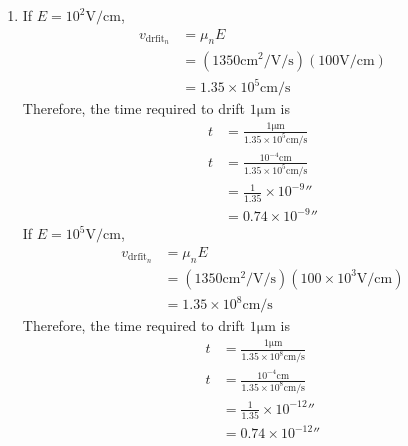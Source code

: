 \documentclass[fleqn, a4paper, 11pt, oneside]{amsart}
\theoremstyle{definition}
\theoremstyle{theorem}
\begin{document}
\begin{solution}
\begin{enumerate}[leftmargin=*]
\begin{figure}[H]
			\end{figure}
		\item
			If $E = 10^2 \si{\volt\per\centi\metre}$,
			\begin{align*}
				v_{\text{drfit}_n} & = \mu_n E                                                                                                         \\
                                                   & = \left( 1350 \si{\centi\metre\squared\per\volt\per\second} \right) \left( 100 \si{\volt\per\centi\metre} \right) \\
                                                   & = 1.35 \times 10^5 \si{\centi\metre\per\second}
			\end{align*}
			Therefore, the time required to drift $1 \si{\micro\metre}$ is
			\begin{align*}
				t & = \frac{1 \si{\micro\metre}}{1.35 \times 10^5 \si{\centi\metre\per\second}}       \\
				t & = \frac{10^{-4} \si{\centi\metre}}{1.35 \times 10^5 \si{\centi\metre\per\second}} \\
                                  & = \frac{1}{1.35} \times 10^{-9} \second                                           \\
                                  & = 0.74 \times10^{-9} \second
			\end{align*}
			If $E = 10^5 \si{\volt\per\centi\metre}$,
			\begin{align*}
				v_{\text{drfit}_n} & = \mu_n E                                                                                                                     \\
                                                   & = \left( 1350 \si{\centi\metre\squared\per\volt\per\second} \right) \left( 100 \times 10^3 \si{\volt\per\centi\metre} \right) \\
                                                   & = 1.35 \times 10^8 \si{\centi\metre\per\second}
			\end{align*}
			Therefore, the time required to drift $1 \si{\micro\metre}$ is
			\begin{align*}
				t & = \frac{1 \si{\micro\metre}}{1.35 \times 10^8 \si{\centi\metre\per\second}}       \\
				t & = \frac{10^{-4} \si{\centi\metre}}{1.35 \times 10^8 \si{\centi\metre\per\second}} \\
                                  & = \frac{1}{1.35} \times 10^{-12} \second                                          \\
                                  & = 0.74 \times10^{-12} \second
			\end{align*}
	\end{enumerate}
\end{solution}
\end{document}
